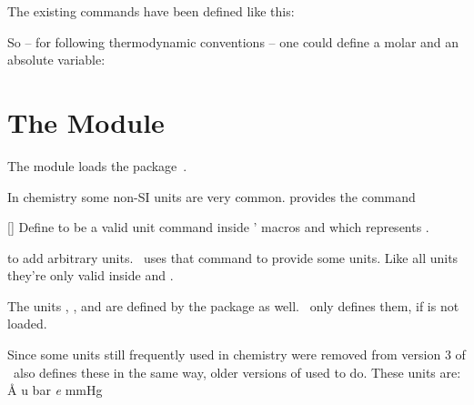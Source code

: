 \documentclass{chemmacros-manual}
\begin{document}
The existing commands have been defined like this:
\begin{sourcecode}
  \NewChemState {}
  \NewChemState {}
  \NewChemState {}
\end{sourcecode}

So -- for following thermodynamic conventions -- one could define a molar and
an absolute variable:
\begin{example}
  \RenewChemState{}%
  \NewChemState{}%
   
\end{example}

\section{The  Module}\label{sec:units-module}

The  module loads the 
package~\cite{pkg:siunitx}.

In chemistry some non-SI units are very common.   provides the
command
\begin{commands}
  []
    Define  to be a valid unit command inside ' macros
     and  which represents .
\end{commands}
to add arbitrary units.  \chemmacros\ uses that command to provide some
units.  Like all  units they're only valid inside
 and .
\begin{commands}
   \unit{\atmosphere}
   \unit{\atm}
   \unit{\calory}
   \unit{\cal}
   \unit{\cmc} \par
    The units , , and  are defined by the
    package  as well.  \chemmacros\ only defines them, if
     is not loaded.
   \unit{\molar}
   \unit{\moLar}
   \unit{\Molar}
   \unit{\MolMass}
   \unit{\normal}
   \unit{\torr}\par
  Since some units still frequently used in chemistry were
  removed from version 3 of  \chemmacros\ also defines these in
  the same way, older versions of  used to do. These units are:
   \unit{\angstrom}
   \unit{\atomicmassunit}
   \unit{\bar}
   \unit{\elementarycharge}
   \unit{\mmHg}
\end{commands}
\end{document}
